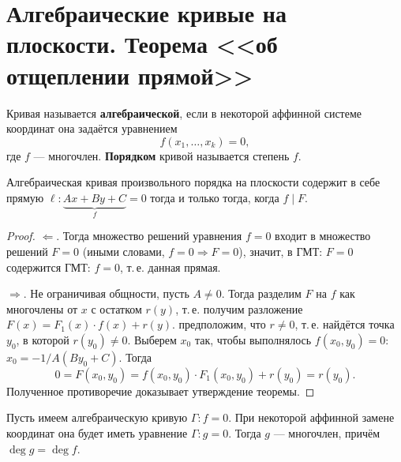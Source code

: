 \section{Алгебраические кривые на плоскости. Теорема <<об отщеплении прямой>>}

\begin{definition}
    Кривая называется \textbf{алгебраической}, если в некоторой аффинной системе координат она задаётся уравнением
    $$f(x_1, \ldots, x_k) = 0,$$
    где $f$ --- многочлен. \textbf{Порядком} кривой называется степень $f$.
\end{definition}

\begin{theorem}
    Алгебраическая кривая произвольного порядка на плоскости содержит в себе прямую $\ell: \underbrace{Ax + By + C}_{f} = 0$ тогда и только тогда, когда $f \mid F$.
\end{theorem}

\begin{proof}
    $\Leftarrow$. Тогда множество решений уравнения $f = 0$ входит в множество решений $F = 0$ (иными словами, $f = 0 \Rightarrow F = 0$), значит, в ГМТ: $F = 0$ содержится ГМТ: $f = 0$, т.\,е. данная прямая.

    $\Rightarrow$. Не ограничивая общности, пусть $A \ne 0$. Тогда разделим $F$ на $f$ как многочлены от $x$ с остатком $r(y)$, т.\,е. получим разложение $F(x) = F_1(x)\cdot f(x) + r(y)$. предположим, что $r \ne 0$, т.\,е. найдётся точка $y_0$, в которой $r(y_0) \ne 0$. Выберем $x_0$ так, чтобы выполнялось $f(x_0, y_0) = 0$: $x_0 = -1/A(By_0 + C)$. Тогда
    $$0 = F(x_0, y_0) = f(x_0, y_0) \cdot F_1(x_0, y_0) + r(y_0) = r(y_0).$$
    Полученное противоречие доказывает утверждение теоремы.
\end{proof}

\begin{theorem}
    Пусть имеем алгебраическую кривую $\Gamma: f = 0$. При некоторой аффинной замене координат она будет иметь уравнение $\Gamma: g = 0$. Тогда $g$ --- многочлен, причём $\deg g = \deg f$.
\end{theorem}

